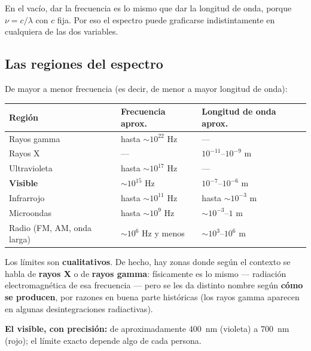 \documentclass[12pt,a4paper]{article}
\begin{document}
\begin{notebox}
En el vacío, dar la frecuencia es lo mismo que dar la longitud de onda, porque
$\nu = c/\lambda$ con $c$ fija. Por eso el espectro puede graficarse
indistintamente en cualquiera de las dos variables.
\end{notebox}

\subsection{Las regiones del espectro}

De mayor a menor frecuencia (es decir, de menor a mayor longitud de onda):

\begin{table}[H]
\centering
\begin{tabular}{lll}
\toprule
\textbf{Región} & \textbf{Frecuencia aprox.} & \textbf{Longitud de onda aprox.} \\
\midrule
Rayos gamma  & hasta $\sim 10^{22}$ Hz & --- \\
Rayos X      & ---                     & $10^{-11}$--$10^{-9}$ m \\
Ultravioleta & hasta $\sim 10^{17}$ Hz & --- \\
\textbf{Visible} & $\sim 10^{15}$ Hz   & $10^{-7}$--$10^{-6}$ m \\
Infrarrojo   & hasta $\sim 10^{11}$ Hz & hasta $\sim 10^{-3}$ m \\
Microondas   & hasta $\sim 10^{9}$ Hz  & $\sim 10^{-3}$--$1$ m \\
Radio (FM, AM, onda larga) & $\sim 10^{6}$ Hz y menos
             & $\sim 10^{3}$--$10^{6}$ m \\
\bottomrule
\end{tabular}
\end{table}



\begin{warnbox}
Los límites son \textbf{cualitativos}. De hecho, hay zonas donde según el contexto
se habla de \textbf{rayos X} o de \textbf{rayos gamma}: físicamente es lo mismo
--- radiación electromagnética de esa frecuencia --- pero se les da distinto
nombre según \textbf{cómo se producen}, por razones en buena parte históricas (los
rayos gamma aparecen en algunas desintegraciones radiactivas).
\end{warnbox}

\textbf{El visible, con precisión:} de aproximadamente \SI{400}{\nano\metre}
(violeta) a \SI{700}{\nano\metre} (rojo); el límite exacto depende algo de cada
persona.
\end{document}
